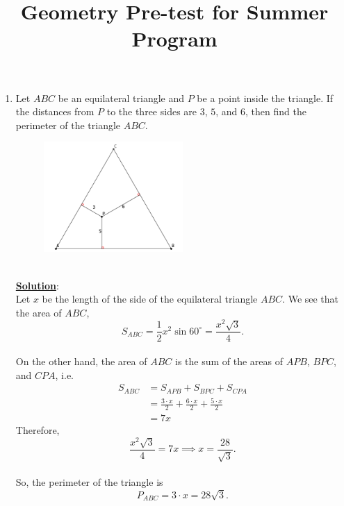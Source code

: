 \documentclass[a4paper]{article}
\begin{document}
\title{Geometry Pre-test for Summer Program}
\begin{enumerate}
	\item Let $ABC$ be an equilateral triangle and $P$ be a point
		inside the triangle. If the distances from $P$ to the
		three sides are $3$, $5$, and $6$, then find the perimeter
		of the triangle $ABC$.
		\begin{figure}[htpb]
			\centering
			\includegraphics[width=0.5\textwidth]{test_prob1.png}
			\caption{}
			\label{fig:test_prob1-png}
		\end{figure}\\
		\underline{\textbf{Solution}}:\\
		Let $x$ be the length of the side of the equilateral
		triangle $ABC$. We see that the area of $ABC$, 
		\[
			S_{ABC} = \frac{1}{2}x^2\sin60^{\circ} = \frac{x^2\sqrt{3}}{4}
		.\] \\
		On the other hand, the area of $ABC$ is the sum of the
		areas of $APB$, $BPC$, and $CPA$, i.e.
		\begin{align*}
			S_{ABC} &= S_{APB} + S_{BPC} + S_{CPA} \\
			&= \frac{3\cdot x}{2} + 
			\frac{6\cdot x}{2} +
			\frac{5\cdot x}{2}\\
			&= 7x 
		\end{align*}
		Therefore, 
		\[
			\frac{x^2\sqrt{3} }{4} = 7x \implies
			x = \frac{28}{\sqrt{3} }
		.\] \\
		So, the perimeter of the triangle is
		\[
		P_{ABC} = 3\cdot x = 28\sqrt{3} 
		.\] 


\end{enumerate}
\end{document}
